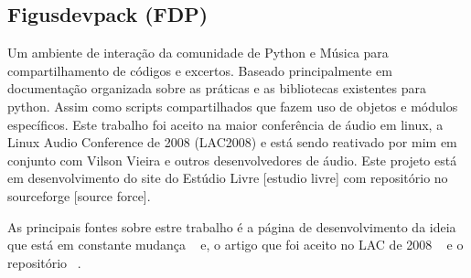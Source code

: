 \subsection{Figusdevpack (FDP)}

Um ambiente de interação da comunidade de Python e Música 
para compartilhamento de códigos e excertos. Baseado principalmente
em documentação organizada sobre as práticas e as bibliotecas
existentes para python. Assim como scripts compartilhados que
fazem uso de objetos e módulos específicos. Este trabalho foi aceito na
maior conferência de áudio em linux, a Linux Audio Conference de 2008
(LAC2008) e está sendo reativado por mim em conjunto com Vilson Vieira
e outros desenvolvedores de áudio. Este projeto está em desenvolvimento
do site do Estúdio Livre [estudio livre] com repositório no sourceforge [source force].

As principais fontes sobre estre trabalho é a página de desenvolvimento da ideia
que está em constante mudança ~\cite{http://estudiolivre.org/tiki-index.php?page=fdp&highlight=fdp fdpel}
e, o artigo que foi aceito no LAC de 2008 ~\cite{http://www.estudiolivre.org/el-gallery_view.php?arquivoId=8221 fdplac2008}
e o repositório ~\cite{http://sourceforge.net/projects/fdpack/develop fdpsf}.
